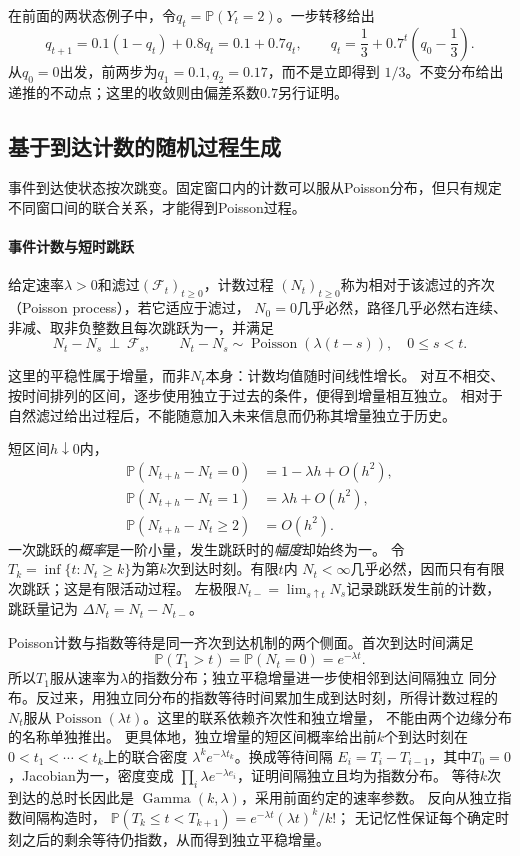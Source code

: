 在前面的两状态例子中，令\(q_t=\mathbb P(Y_t=2)\)。一步转移给出
\[
q_{t+1}=0.1(1-q_t)+0.8q_t=0.1+0.7q_t,
\qquad q_t=\frac13+0.7^t\left(q_0-\frac13\right).
\]
从\(q_0=0\)出发，前两步为\(q_1=0.1,q_2=0.17\)，而不是立即得到
\(1/3\)。不变分布给出递推的不动点；这里的收敛则由偏差系数\(0.7\)另行证明。

\subsection{基于到达计数的随机过程生成}
\label{sec:rv-poisson}
事件到达使状态按次跳变。固定窗口内的计数可以服从Poisson分布，但只有规定不同窗口间的联合关系，才能得到Poisson过程。

\paragraph{事件计数与短时跳跃}
\begin{definition}[齐次Poisson过程]
\label{def:rv-poisson-process}
给定速率\(\lambda>0\)和滤过\((\mathcal F_t)_{t\geq0}\)，计数过程
\((N_t)_{t\geq0}\)称为相对于该滤过的齐次（Poisson process），若它适应于滤过，
\(N_0=0\)几乎必然，路径几乎必然右连续、非减、取非负整数且每次跳跃为一，并满足
\[
N_t-N_s\ \perp\ \mathcal F_s,\qquad
N_t-N_s\sim\operatorname{Poisson}(\lambda(t-s)),
\quad 0\leq s<t.
\]
\end{definition}
这里的平稳性属于增量，而非\(N_t\)本身：计数均值随时间线性增长。
对互不相交、按时间排列的区间，逐步使用独立于过去的条件，便得到增量相互独立。
相对于自然滤过给出过程后，不能随意加入未来信息而仍称其增量独立于历史。

短区间\(h\downarrow0\)内，
\[
\begin{aligned}
\mathbb P(N_{t+h}-N_t=0)&=1-\lambda h+O(h^2),\\
\mathbb P(N_{t+h}-N_t=1)&=\lambda h+O(h^2),\\
\mathbb P(N_{t+h}-N_t\geq2)&=O(h^2).
\end{aligned}
\]
一次跳跃的\emph{概率}是一阶小量，发生跳跃时的\emph{幅度}却始终为一。
令\(T_k=\inf\{t:N_t\geq k\}\)为第\(k\)次到达时刻。有限\(t\)内
\(N_t<\infty\)几乎必然，因而只有有限次跳跃；这是有限活动过程。
左极限\(N_{t-}=\lim_{s\uparrow t}N_s\)记录跳跃发生前的计数，跳跃量记为
\(\Delta N_t=N_t-N_{t-}\)。

Poisson计数与指数等待是同一齐次到达机制的两个侧面。首次到达时间满足
\[
  \mathbb{P}(T_1>t)
  =
  \mathbb{P}(N_t=0)
  =
  e^{-\lambda t}.
\]
所以\(T_1\)服从速率为\(\lambda\)的指数分布；独立平稳增量进一步使相邻到达间隔独立
同分布。反过来，用独立同分布的指数等待时间累加生成到达时刻，所得计数过程的
\(N_t\)服从\(\operatorname{Poisson}(\lambda t)\)。这里的联系依赖齐次性和独立增量，
不能由两个边缘分布的名称单独推出。
更具体地，独立增量的短区间概率给出前\(k\)个到达时刻在
\(0<t_1<\cdots<t_k\)上的联合密度
\(\lambda^k e^{-\lambda t_k}\)。换成等待间隔
\(E_i=T_i-T_{i-1}\)，其中\(T_0=0\)，Jacobian为一，密度变成
\(\prod_i\lambda e^{-\lambda e_i}\)，证明间隔独立且均为指数分布。
等待\(k\)次到达的总时长因此是
\(\operatorname{Gamma}(k,\lambda)\)，采用前面约定的速率参数。
反向从独立指数间隔构造时，
\(\mathbb P(T_k\leq t<T_{k+1})=e^{-\lambda t}(\lambda t)^k/k!\)；
无记忆性保证每个确定时刻之后的剩余等待仍指数，从而得到独立平稳增量。

